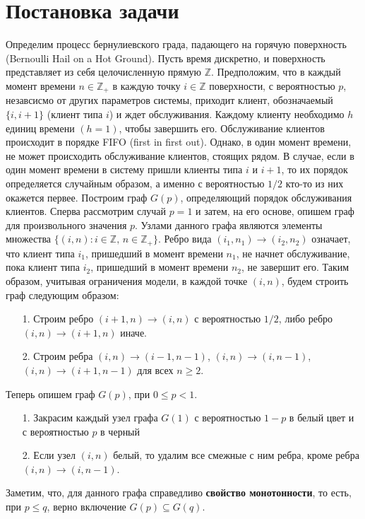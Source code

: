 \documentclass[10pt, reqno]{amsart}
\author{{А.В. Резлер, М.Г. Чебунин}}%
\begin{document}
\renewcommand{\refname}{References}
\renewcommand{\proofname}{Доказательство.}
\renewcommand{\figurename}{Fig.}
\thispagestyle{empty}
\section{Постановка задачи}
Определим процесс бернулиевского града, падающего на горячую поверхность (Bernoulli Hail on a Hot Ground). Пусть время дискретно, и поверхность представляет из себя целочисленную прямую $\mathbb{Z}$. Предположим, что в каждый момент времени $n \in \mathbb{Z}_{+}$ в каждую точку $i \in \mathbb{Z}$ поверхности, с вероятностью $p$, незавсисмо от других параметров системы, приходит клиент, обозначаемый $\{i, i+1\}$ (клиент типа $i$) и ждет обслуживания. Каждому клиенту необходимо $h$ единиц времени $(h=1)$, чтобы завершить его. Обслуживание клиентов происходит в порядке FIFO (first in first out). Однако, в один момент времени, не может происходить обслуживание клиентов, стоящих рядом. В случае, если в один момент времени в систему пришли клиенты типа $i$ и $i+1$, то их порядок определяется случайным образом, а именно с вероятностью $1/2$ кто-то из них окажется первее. Построим граф $G(p)$, определяющий порядок обслуживания клиентов. Сперва рассмотрим случай $p=1$ и затем, на его основе, опишем граф для произвольного значения $p$. Узлами данного графа являются элементы множества $\{(i,n) : i \in \mathbb{Z} \text{,  } n \in \mathbb{Z}_{+}\}$. Ребро вида $(i_{1},n_{1}) \xrightarrow{} (i_{2},n_{2})$ означает, что клиент типа $i_{1}$, пришедший в момент времени $n_{1}$, не начнет обслуживание, пока клиент типа $i_{2}$, пришедший в момент времени $n_{2}$, не завершит его. Таким образом, учитывая ограничения модели, в каждой точке $(i, n)$, будем строить граф следующим образом:
\begin{enumerate} 
  \item[1.] Строим ребро $(i+1,n) \xrightarrow{} (i,n)$ с вероятностью $1/2$, либо ребро $(i,n) \xrightarrow{} (i+1,n)$ иначе.
  \item[2.] Строим ребра $(i,n) \xrightarrow{} (i-1,n-1)$, $(i,n) \xrightarrow{} (i,n-1)$, $(i,n) \xrightarrow{} (i+1,n-1)$ для всех $n \geq 2$.
\end{enumerate}
Теперь опишем граф $G(p)$, при $0 \leq p < 1$.
\begin{enumerate} 
  \item[1.] Закрасим каждый узел графа $G(1)$ с вероятностью $1-p$ в белый цвет и с вероятностью $p$ в черный
  \item[2.] Если узел $(i,n)$ белый, то удалим все смежные с ним ребра, кроме ребра $(i,n) \xrightarrow{} (i,n-1)$.
\end{enumerate}
Заметим, что, для данного графа справедливо \textbf{свойство монотонности}, то есть, при $p \leq q$, верно включение $G(p) \subseteq G(q)$.\\
\end{document}
